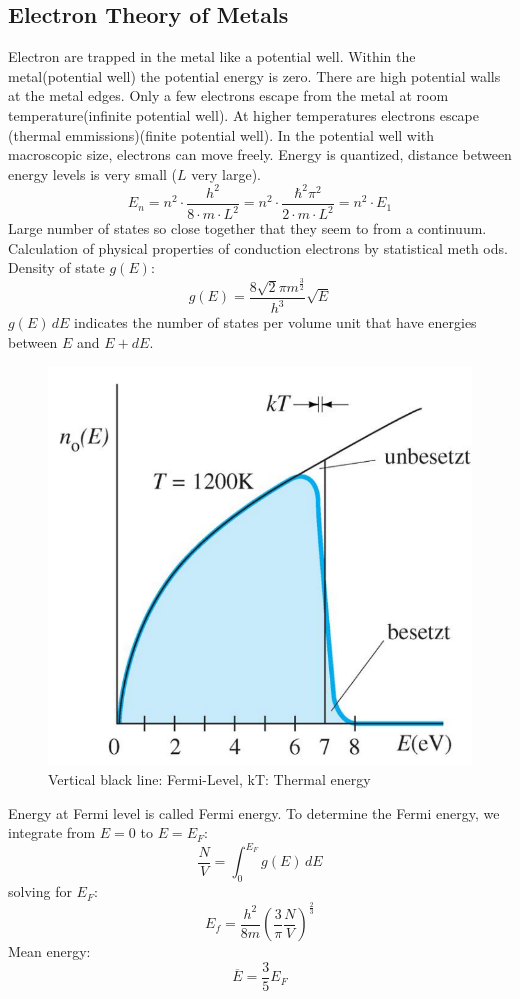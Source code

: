 \subsection{Electron Theory of Metals}
Electron are trapped in the metal like a potential well.
Within the metal(potential well) the potential energy is zero.
There are high potential walls at the metal edges.
Only a few electrons escape from the metal at room temperature(infinite potential well).
At higher temperatures electrons escape (thermal emmissions)(finite potential well).
In the potential well with macroscopic size, electrons can move freely.
Energy is quantized, distance between energy levels is very small (\(L\) very large).
\begin{equation*}
    E_n = n^2 \cdot \frac{h^2}{8 \cdot m \cdot L^2} = n^2 \cdot \frac{\hbar^2 \pi^2}{2\cdot m \cdot L^2} = n^2 \cdot E_1
\end{equation*}
Large number of states so close together that they seem to from a continuum.
Calculation of physical properties of conduction electrons by statistical meth ods.
Density of state \(g(E)\):
\begin{equation*}
    g(E) = \frac{8\sqrt{2}\pi m^{\frac{3}{2}}}{h^3}\sqrt{E}
\end{equation*}
\(g(E)\,dE\) indicates the number of states per volume unit that have energies between \(E\) and \(E + dE\).
\begin{figure}[h]
    \centering
    \includegraphics[width=0.8\columnwidth]{images/metals.png}
    \caption{Vertical black line: Fermi-Level, kT: Thermal energy}
    \label{fig:metals}
\end{figure}
Energy at Fermi level is called Fermi energy.
To determine the Fermi energy, we integrate from \(E = 0\) to \(E = E_F\):
\[
\frac{N}{V} = \int_{0}^{E_F}g(E)\, dE
\]
solving for \(E_F\):
\[
E_f = \frac{h^2}{8m}\left(\frac{3}{\pi}\frac{N}{V}\right)^{\frac{2}{3}}
\]
Mean energy:
\[
\overline{E} = \frac{3}{5}E_F
\]


